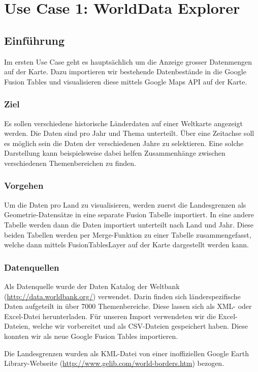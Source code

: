 \chapter{Use Case 1: WorldData Explorer}

\section{Einführung}
Im ersten Use Case geht es hauptsächlich um die Anzeige grosser Datenmengen auf der Karte. Dazu importieren wir bestehende Datenbestände in die Google Fusion Tables und visualisieren diese mittels Google Maps API auf der Karte.

\subsection{Ziel}
Es sollen verschiedene historische Länderdaten auf einer Weltkarte angezeigt werden. Die Daten sind pro Jahr und Thema unterteilt. Über eine Zeitachse soll es möglich sein die Daten der verschiedenen Jahre zu selektieren. Eine solche Darstellung kann beispielsweise dabei helfen Zusammenhänge zwischen verschiedenen Themenbereichen zu finden.

\subsection{Vorgehen}
Um die Daten pro Land zu visualisieren, werden zuerst die Landesgrenzen als Geometrie-Datensätze in eine separate Fusion Tabelle importiert. In eine andere Tabelle werden dann die Daten importiert unterteilt nach Land und Jahr. Diese beiden Tabellen werden per Merge-Funktion zu einer Tabelle zusammengefasst, welche dann mittels FusionTablesLayer auf der Karte dargestellt werden kann.

\subsection{Datenquellen}
Als Datenquelle wurde der Daten Katalog der Weltbank (\url{http://data.worldbank.org/}) verwendet. Darin finden sich länderspezifische Daten aufgeteilt in über 7000 Themenbereiche. Diese lassen sich als XML- oder Excel-Datei herunterladen. Für unseren Import verwendeten wir die Excel-Dateien, welche wir vorbereitet und als CSV-Dateien gespeichert haben. Diese konnten wir als neue Google Fusion Tables importieren.

Die Landesgrenzen wurden als \gls{KML}-Datei von einer inoffiziellen Google Earth Library-Webseite (\url{http://www.gelib.com/world-borders.htm}) bezogen. 


